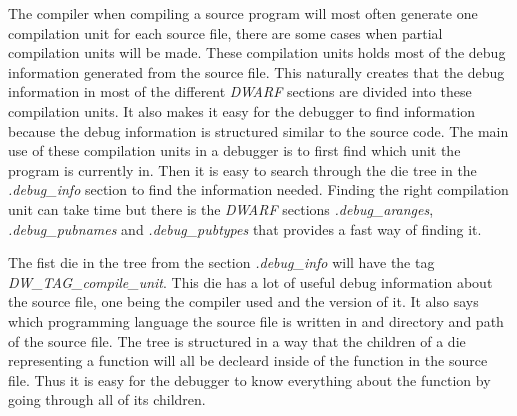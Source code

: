  


The compiler when compiling a source program will most often generate one compilation unit for each source file, there are some cases when partial compilation units will be made.
These compilation units holds most of the debug information generated from the source file.
This naturally creates that the debug information in most  of the different \emph{DWARF} sections are divided into these compilation units.
It also makes it easy for the debugger to find information because the debug information is structured similar to the source code.
The main use of these compilation units in a debugger is to first find which unit the program is currently in.
Then it is easy to search through the \gls{die} \gls{tree} in the \emph{.debug\_info} section to find the information needed. 
Finding the right compilation unit can take time but there is the \emph{DWARF} sections \emph{.debug\_aranges}, \emph{.debug\_pubnames} and \emph{.debug\_pubtypes} that provides a fast way of finding it.

The fist \gls{die} in the \gls{tree} from the section \emph{.debug\_info} will have the tag \emph{DW\_TAG\_compile\_unit}.
This \gls{die} has a lot of useful debug information about the source file, one being the compiler used and the version of it.
It also says which programming language the source file is written in and directory and path of the source file.
The \gls{tree} is structured in a way that the children of a \gls{die} representing a function will all be decleard inside of the function in the source file.
Thus it is easy for the debugger to know everything about the function by going through all of its children.

